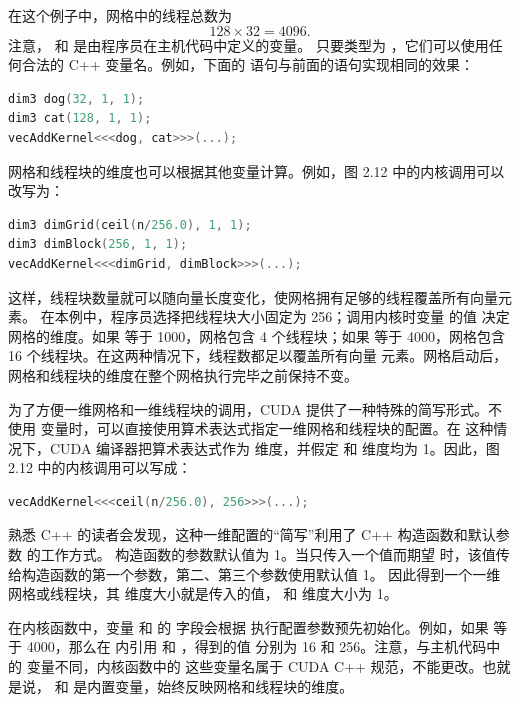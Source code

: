 在这个例子中，网格中的线程总数为
\[
  128 \times 32 = 4096.
\]
注意， 和  是由程序员在主机代码中定义的变量。
只要类型为 ，它们可以使用任何合法的 C++ 变量名。例如，下面的
语句与前面的语句实现相同的效果：

\begin{lstlisting}[language=C++]
dim3 dog(32, 1, 1);
dim3 cat(128, 1, 1);
vecAddKernel<<<dog, cat>>>(...);
\end{lstlisting}

网格和线程块的维度也可以根据其他变量计算。例如，图 2.12 中的内核调用可以
改写为：

\begin{lstlisting}[language=C++]
dim3 dimGrid(ceil(n/256.0), 1, 1);
dim3 dimBlock(256, 1, 1);
vecAddKernel<<<dimGrid, dimBlock>>>(...);
\end{lstlisting}

这样，线程块数量就可以随向量长度变化，使网格拥有足够的线程覆盖所有向量元素。
在本例中，程序员选择把线程块大小固定为 256；调用内核时变量  的值
决定网格的维度。如果  等于 1000，网格包含 4 个线程块；如果 
等于 4000，网格包含 16 个线程块。在这两种情况下，线程数都足以覆盖所有向量
元素。网格启动后，网格和线程块的维度在整个网格执行完毕之前保持不变。

为了方便一维网格和一维线程块的调用，CUDA 提供了一种特殊的简写形式。不使用
 变量时，可以直接使用算术表达式指定一维网格和线程块的配置。在
这种情况下，CUDA 编译器把算术表达式作为  维度，并假定  和
 维度均为 1。因此，图 2.12 中的内核调用可以写成：

\begin{lstlisting}[language=C++]
vecAddKernel<<<ceil(n/256.0), 256>>>(...);
\end{lstlisting}

熟悉 C++ 的读者会发现，这种一维配置的“简写”利用了 C++ 构造函数和默认参数
的工作方式。 构造函数的参数默认值为 1。当只传入一个值而期望
 时，该值传给构造函数的第一个参数，第二、第三个参数使用默认值 1。
因此得到一个一维网格或线程块，其  维度大小就是传入的值， 和
 维度大小为 1。

在内核函数中，变量  和  的  字段会根据
执行配置参数预先初始化。例如，如果  等于 4000，那么在
 内引用  和 ，得到的值
分别为 16 和 256。注意，与主机代码中的  变量不同，内核函数中的
这些变量名属于 CUDA C++ 规范，不能更改。也就是说， 和
 是内置变量，始终反映网格和线程块的维度。

